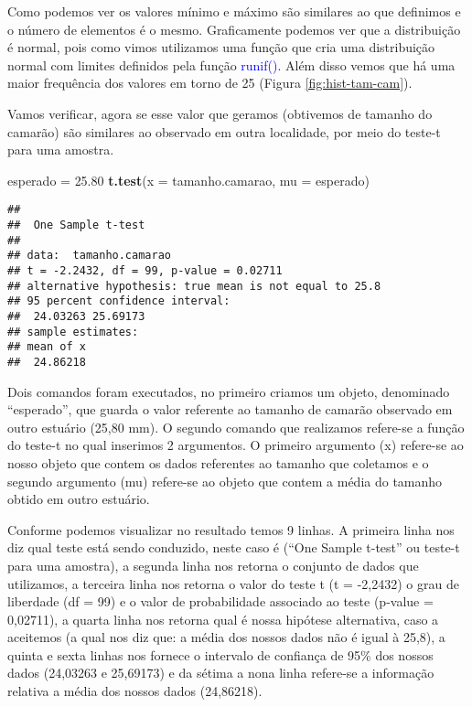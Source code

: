 \documentclass[titlepage, oneside, openany, a4paper]{book}
\newenvironment{Shaded}{\begin{snugshade}}{\end{snugshade}}
\newcommand{\DataTypeTok}[1]{\textcolor[rgb]{0.13,0.29,0.53}{#1}}
\newcommand{\FloatTok}[1]{\textcolor[rgb]{0.00,0.00,0.81}{#1}}
\newcommand{\KeywordTok}[1]{\textcolor[rgb]{0.13,0.29,0.53}{\textbf{#1}}}
\newcommand{\NormalTok}[1]{#1}
\newcommand{\StringTok}[1]{\textcolor[rgb]{0.31,0.60,0.02}{#1}}
\begin{document}
Como podemos ver os valores mínimo e máximo são similares ao que definimos e o número de elementos é o mesmo. Graficamente podemos ver que a distribuição é normal, pois como vimos utilizamos uma função que cria uma distribuição normal com limites definidos pela função \textcolor{blue}{runif()}. Além disso vemos que há uma maior frequência dos valores em torno de 25 (Figura \ref{fig:hist-tam-cam}).

Vamos verificar, agora se esse valor que geramos (obtivemos de tamanho do camarão) são similares ao observado em outra localidade, por meio do teste-t para uma amostra.

\begin{Shaded}
\begin{Highlighting}[]
\NormalTok{esperado =}\StringTok{ }\FloatTok{25.80}
\KeywordTok{t.test}\NormalTok{(}\DataTypeTok{x =}\NormalTok{ tamanho.camarao, }\DataTypeTok{mu =}\NormalTok{ esperado)}
\end{Highlighting}
\end{Shaded}

\begin{verbatim}
## 
##  One Sample t-test
## 
## data:  tamanho.camarao
## t = -2.2432, df = 99, p-value = 0.02711
## alternative hypothesis: true mean is not equal to 25.8
## 95 percent confidence interval:
##  24.03263 25.69173
## sample estimates:
## mean of x 
##  24.86218
\end{verbatim}

Dois comandos foram executados, no primeiro criamos um objeto, denominado ``esperado'', que guarda o valor referente ao tamanho de camarão observado em outro estuário (25,80 mm). O segundo comando que realizamos refere-se a função do teste-t no qual inserimos 2 argumentos. O primeiro argumento (x) refere-se ao nosso objeto que contem os dados referentes ao tamanho que coletamos e o segundo argumento (mu) refere-se ao objeto que contem a média do tamanho obtido em outro estuário.

Conforme podemos visualizar no resultado temos 9 linhas. A primeira linha nos diz qual teste está sendo conduzido, neste caso é (``One Sample t-test'' ou teste-t para uma amostra), a segunda linha nos retorna o conjunto de dados que utilizamos, a terceira linha nos retorna o valor do teste t (t = -2,2432) o grau de liberdade (df = 99) e o valor de probabilidade associado ao teste (p-value = 0,02711), a quarta linha nos retorna qual é nossa hipótese alternativa, caso a aceitemos (a qual nos diz que: a média dos nossos dados não é igual à 25,8), a quinta e sexta linhas nos fornece o intervalo de confiança de 95\% dos nossos dados (24,03263 e 25,69173) e da sétima a nona linha refere-se a informação relativa a média dos nossos dados (24,86218).
\end{document}
